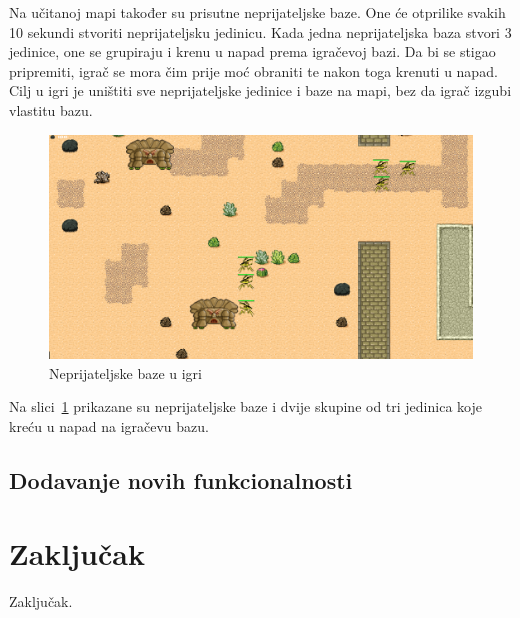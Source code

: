 \documentclass[times, utf8, zavrsni, numeric]{fer}
\begin{document}
\par Na učitanoj mapi također su prisutne neprijateljske baze.
One će otprilike svakih 10 sekundi stvoriti neprijateljsku jedinicu.
Kada jedna neprijateljska baza stvori 3 jedinice, one se grupiraju i krenu u napad prema igračevoj bazi.
Da bi se stigao pripremiti, igrač se mora čim prije moć obraniti te nakon toga krenuti u napad.
Cilj u igri je uništiti sve neprijateljske jedinice i baze na mapi, bez da igrač izgubi vlastitu bazu. 

\begin{figure}[h]
	\centering
	\includegraphics[width=0.8\linewidth]{images/enemyBases.png}
	\caption{Neprijateljske baze u igri}
	\label{fig:enemyBases}
\end{figure}

\par Na slici~\ref{fig:enemyBases} prikazane su neprijateljske baze i dvije skupine od tri jedinica koje kreću u napad na igračevu bazu.


\section{Dodavanje novih funkcionalnosti}

\chapter{Zaključak}\label{ch:conclusion}
Zaključak.



\end{document}
